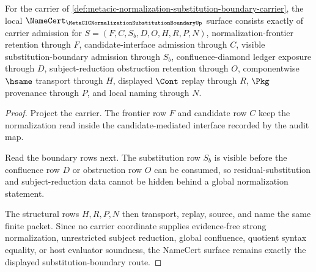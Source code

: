 \begin{theorem}
\label{thm:metacic-normalization-substitution-boundary-namecert-obligations}
For the carrier of \autoref{def:metacic-normalization-substitution-boundary-carrier}, the local $\NameCert_{\MetaCICNormalizationSubstitutionBoundaryUp}$ surface consists exactly of carrier admission for $S=(F,C,S_b,D,O,H,R,P,N)$, normalization-frontier retention through $F$, candidate-interface admission through $C$, visible substitution-boundary admission through $S_b$, confluence-diamond ledger exposure through $D$, subject-reduction obstruction retention through $O$, componentwise $\hsame$ transport through $H$, displayed $\Cont$ replay through $R$, $\Pkg$ provenance through $P$, and local naming through $N$.
\end{theorem}
\begin{proof}
Project the carrier. The frontier row $F$ and candidate row $C$ keep the normalization read inside the candidate-mediated interface recorded by the audit map.

Read the boundary rows next. The substitution row $S_b$ is visible before the confluence row $D$ or obstruction row $O$ can be consumed, so residual-substitution and subject-reduction data cannot be hidden behind a global normalization statement.

The structural rows $H,R,P,N$ then transport, replay, source, and name the same finite packet. Since no carrier coordinate supplies evidence-free strong normalization, unrestricted subject reduction, global confluence, quotient syntax equality, or host evaluator soundness, the NameCert surface remains exactly the displayed substitution-boundary route.
\end{proof}



